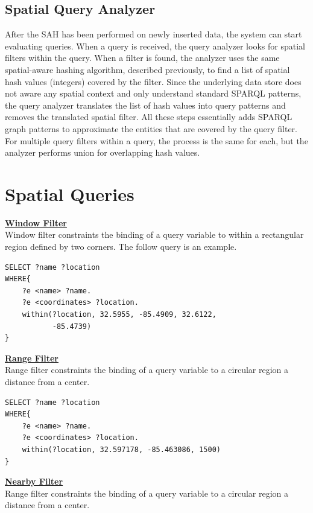 \subsection{Spatial Query Analyzer}

After the SAH has been performed on newly inserted data, the system can start evaluating queries. When a query is received, the query analyzer looks for spatial filters within the query. When a filter is found, the analyzer uses the same spatial-aware hashing algorithm, described previously, to find a list of spatial hash values (integers) covered by the filter. Since the underlying data store does not aware any spatial context and only understand standard SPARQL patterns, the query analyzer translates the list of hash values into query patterns and removes the translated spatial filter. All these steps essentially adds SPARQL graph patterns to approximate the entities that are covered by the query filter. For multiple query filters within a query, the process is the same for each, but the analyzer performs union for overlapping hash values.

\section{Spatial Queries}

\underline{\textbf{Window Filter}} \\
Window filter constraints the binding of a query variable to within a rectangular region defined by two corners. The follow query is an example.

\begin{verbatim}
SELECT ?name ?location
WHERE{
    ?e <name> ?name.
    ?e <coordinates> ?location.
    within(?location, 32.5955, -85.4909, 32.6122,
           -85.4739)
}
\end{verbatim}

\underline{\textbf{Range Filter}} \\
Range filter constraints the binding of a query variable to a circular region a distance from a center.

\begin{verbatim}
SELECT ?name ?location
WHERE{
    ?e <name> ?name.
    ?e <coordinates> ?location.
    within(?location, 32.597178, -85.463086, 1500)
}
\end{verbatim}

\underline{\textbf{Nearby Filter}} \\
Range filter constraints the binding of a query variable to a circular region a distance from a center.

